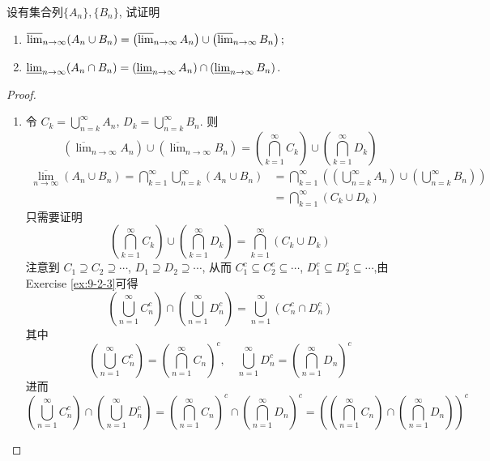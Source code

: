 \documentclass[../main.tex]{subfiles}
\begin{document}
\begin{exercise}{}{}
设有集合列$\{A_n\}, \{B_n\}$, 试证明
\begin{enumerate}
    \item[(i)] $\varlimsup_{n\to\infty} (A_n \cup B_n) = \left(\varlimsup_{n\to\infty} A_n\right) \cup \left(\varlimsup_{n\to\infty} B_n\right);$
    \item[(ii)] $\varliminf_{n\to\infty} (A_n \cap B_n) = \left(\varliminf_{n\to\infty} A_n\right) \cap \left(\varliminf_{n\to\infty} B_n\right).$
\end{enumerate}
\end{exercise}
\begin{proof}
    \begin{enumerate}
        \item 令 \(  C_{k}= \bigcup _{n = k}^{\infty}A_{n}   \), \(  D_{k}= \bigcup _{n = k}^{\infty}B_{n}  \). 则 \[
    \left( \overline{\lim}_{n\to \infty}A_{n} \right)\cup \left( \overline{\lim}_{n\to \infty}B_{n} \right)=\left(  \bigcap_{k= 1}^{\infty}C_{k} \right) \cup    \left( \bigcap_{k= 1}^{\infty}D_{k}  \right) 
    \]   \[
    \begin{aligned}
    \overline{\lim_{n\to \infty}}\left( A_{n}\cup B_{n} \right)=  \bigcap_{k= 1}^{\infty}\bigcup _{n = k}^{\infty}\left( A_{n}\cup B_{n} \right)&= \bigcap_{k= 1}^{\infty}\left(   \left( \bigcup _{n = k}^{\infty}A_{n} \right)\cup \left( \bigcup _{n = k}^{\infty}B_{n}  \right)   \right)  \\ 
     &=  \bigcap_{k= 1}^{\infty}\left( C_{k}\cup D_{k} \right)  
    \end{aligned}
    \]只需要证明 \[
    \left( \bigcap_{k= 1}^{\infty}C_{k}  \right)\cup \left( \bigcap_{k= 1}^{\infty}D_{k}  \right)= \bigcap_{k= 1}^{\infty}\left( C_{k}\cup D_{k} \right)    \tag{*}
    \] 注意到 \(  C_1\supseteq C_2\supseteq \cdots   \), \(  D_1\supseteq D_2\supseteq \cdots   \), 从而 \(  C_1^{c}\subseteq C_2^{c}\subseteq \cdots   \), \(  D_1^{c}\subseteq D_2^{c}\subseteq \cdots   \),由Exercise \ref{ex:9-2-3}可得 \[
    \left( \bigcup _{n = 1}^{\infty}C_{n}^{c} \right)\cap \left( \bigcup _{n = 1}^{\infty}D_{n}^{c} \right)  = \bigcup _{n = 1}^{\infty}\left( C_{n}^{c}\cap D_{n}^{c} \right) 
    \] 其中 \[
    \left( \bigcup _{n = 1}^{\infty}C_{n}^{c} \right)=\left(  \bigcap_{n = 1}^{\infty}C_{n} \right)^{c} ,\quad  \bigcup _{n = 1}^{\infty}D_{n}^{c}=\left(  \bigcap_{n = 1}^{\infty}D_{n}   \right)^{c}  
    \] 进而 \[
    \left( \bigcup _{n = 1}^{\infty}C_{n}^{c} \right)\cap \left( \bigcup _{n = 1}^{\infty}D_{n}^{c} \right)= \left( \bigcap_{n = 1}^{\infty}C_{n}  \right)^{c}\cap \left( \bigcap_{n = 1}^{\infty}D_{n}  \right)^{c}=  \left( \left( \bigcap_{n = 1}^{\infty}C_{n}  \right) \cap  \left( \bigcap_{n = 1}^{\infty}D_{n}  \right)       \right)^{c} 
\]
\end{enumerate}
\end{proof}
\end{document}
